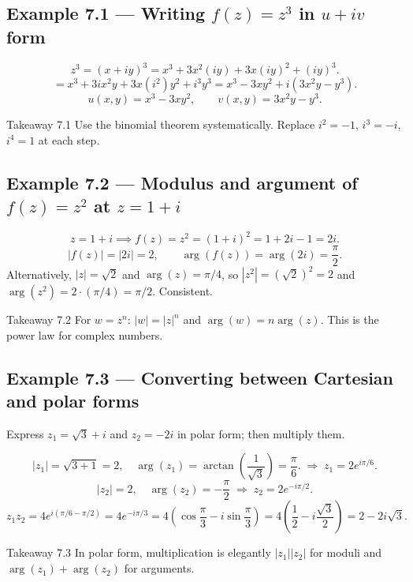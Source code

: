 \documentclass[12pt,a4paper]{article}
\begin{document}
\subsection*{Example 7.1 --- Writing \(f(z)=z^3\) in \(u+iv\) form}

\[
  z^3 = (x+iy)^3 = x^3 + 3x^2(iy) + 3x(iy)^2 + (iy)^3.
\]
\[
  = x^3 + 3ix^2 y + 3x(i^2)y^2 + i^3 y^3
  = x^3 - 3xy^2 + i(3x^2 y - y^3).
\]
\[
  u(x,y) = x^3-3xy^2, \qquad v(x,y)=3x^2 y - y^3.
\]

\begin{learnbox}{Takeaway 7.1}
Use the binomial theorem systematically.  Replace \(i^2=-1\), \(i^3=-i\),
\(i^4=1\) at each step.
\end{learnbox}

\subsection*{Example 7.2 --- Modulus and argument of \(f(z)=z^2\) at
  \(z=1+i\)}

\[
  z = 1+i \implies f(z) = z^2 = (1+i)^2 = 1+2i-1 = 2i.
\]
\[
  |f(z)| = |2i| = 2, \qquad \arg(f(z)) = \arg(2i) = \frac{\pi}{2}.
\]
Alternatively, \(|z|=\sqrt{2}\) and \(\arg(z)=\pi/4\), so
\(|z^2|=(\sqrt{2})^2=2\) and \(\arg(z^2)=2\cdot(\pi/4)=\pi/2\).
Consistent.

\begin{learnbox}{Takeaway 7.2}
For \(w=z^n\): \(|w|=|z|^n\) and \(\arg(w)=n\arg(z)\).  This is the power
law for complex numbers.
\end{learnbox}

\subsection*{Example 7.3 --- Converting between Cartesian and polar forms}

Express \(z_1 = \sqrt{3}+i\) and \(z_2 = -2i\) in polar form; then
multiply them.

\[
  |z_1| = \sqrt{3+1} = 2, \quad
  \arg(z_1) = \arctan\!\left(\frac{1}{\sqrt{3}}\right) = \frac{\pi}{6}.
  \;\Rightarrow\; z_1 = 2e^{i\pi/6}.
\]
\[
  |z_2| = 2, \quad \arg(z_2) = -\frac{\pi}{2}
  \;\Rightarrow\; z_2 = 2e^{-i\pi/2}.
\]
\[
  z_1 z_2 = 4e^{i(\pi/6 - \pi/2)} = 4e^{-i\pi/3}
           = 4\!\left(\cos\frac{\pi}{3} - i\sin\frac{\pi}{3}\right)
           = 4\!\left(\frac{1}{2} - i\frac{\sqrt{3}}{2}\right)
           = 2 - 2i\sqrt{3}.
\]

\begin{learnbox}{Takeaway 7.3}
In polar form, multiplication is elegantly \(|z_1||z_2|\) for moduli and
\(\arg(z_1)+\arg(z_2)\) for arguments.
\end{learnbox}
\end{document}
